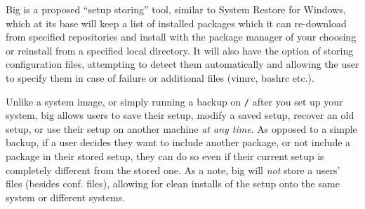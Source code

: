 \documentclass[12pt]{article}
\begin{document}


        Big is a proposed ``setup storing'' tool, similar to System Restore for Windows, which at its base will keep a list of installed packages which it can re-download from specified repositories and install with the package manager of your choosing or reinstall from a specified local directory.  It will also have the option of storing configuration files, attempting to detect them automatically and allowing the user to specify them in case of failure or additional files (vimrc, bashrc etc.).

        Unlike a system image, or simply running a backup on \verb+/+ after you set up your system, big allows users to save their setup, modify a saved setup, recover an old setup, or use their setup on another machine \emph{at any time}.  As opposed to a simple backup, if a user decides they want to include another package, or not include a package in their stored setup, they can do so even if their current setup is completely different from the stored one.  As a note, big will \emph{not} store a users' files (besides conf. files), allowing for clean installs of the setup onto the same system or different systems.
\end{document}
